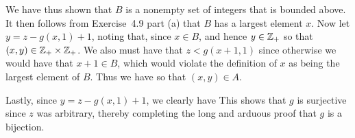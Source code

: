 {{    We have thus shown that $B$ is a nonempty set of integers that is bounded above.
    It then follows from Exercise~4.9 part (a) that $B$ has a largest element $x$.
    Now let $y = z - g(x,1) + 1$, noting that, since $x \in B$,
    and hence $y \in {{\mathbb{Z}}_+}$ so that $(x,y) \in {{\mathbb{Z}}_+} \times {{\mathbb{Z}}_+}$.
    We also must have that $z < g(x+1,1)$ since otherwise we would have that $x+1 \in B$, which would violate the definition of $x$ as being the largest element of $B$.
    Thus we have
    so that $(x,y) \in A$.
    
    Lastly, since $y = z - g(x,1) + 1$, we clearly have
    This shows that $g$ is surjective since $z$ was arbitrary, thereby completing the long and arduous proof that $g$ is a bijection.
  }
}

